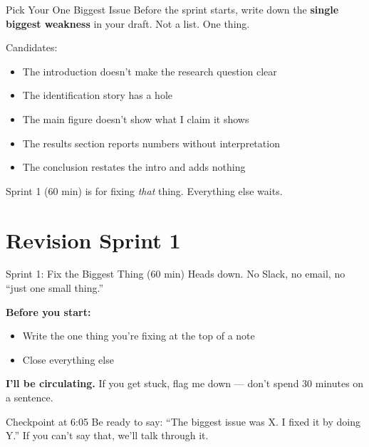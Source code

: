 \begin{frame}{Pick Your One Biggest Issue}
  Before the sprint starts, write down the \textbf{single biggest weakness} in your draft. Not a list. One thing.

  \vspace{8pt}

  Candidates:

  \begin{itemize}\setlength\itemsep{2pt}
    \item The introduction doesn't make the research question clear
    \item The identification story has a hole
    \item The main figure doesn't show what I claim it shows
    \item The results section reports numbers without interpretation
    \item The conclusion restates the intro and adds nothing
  \end{itemize}

  \vspace{8pt}

  Sprint 1 (60 min) is for fixing \textit{that} thing. Everything else waits.
\end{frame}

\section{Revision Sprint 1}

\begin{frame}{Sprint 1: Fix the Biggest Thing (60 min)}
  Heads down. No Slack, no email, no ``just one small thing.''

  \vspace{8pt}

  \textbf{Before you start:}
  \begin{itemize}\setlength\itemsep{1pt}
    \item Write the one thing you're fixing at the top of a note
    \item Close everything else
  \end{itemize}

  \vspace{8pt}

  \textbf{I'll be circulating.} If you get stuck, flag me down --- don't spend 30 minutes on a sentence.

  \vspace{8pt}

  \begin{block}{Checkpoint at 6:05}
    Be ready to say: ``The biggest issue was X. I fixed it by doing Y.'' If you can't say that, we'll talk through it.
  \end{block}
\end{frame}

